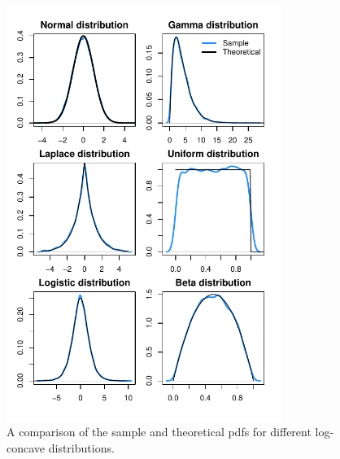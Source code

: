 \documentclass{article}\usepackage[]{graphicx}\usepackage[]{color}
\begin{document}
\begin{figure}
\centering
\includegraphics[width=0.8\textwidth]{figures/densities.pdf}
\caption{A comparison of the sample and theoretical pdfs for
different log-concave distributions.}
\label{fig:dists}
\end{figure}

\clearpage
\end{document}
